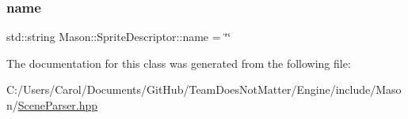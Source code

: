 \hypertarget{class_mason_1_1_sprite_descriptor_a78875744bb1e7ba41d6a35ccf83ba43c}{}\label{class_mason_1_1_sprite_descriptor_a78875744bb1e7ba41d6a35ccf83ba43c} 
\subsubsection{\texorpdfstring{name}{name}}
{\footnotesize\ttfamily std\+::string Mason\+::\+Sprite\+Descriptor\+::name = \char`\"{}\char`\"{}}



The documentation for this class was generated from the following file\+:\begin{DoxyCompactItemize}
\item 
C\+:/\+Users/\+Carol/\+Documents/\+Git\+Hub/\+Team\+Does\+Not\+Matter/\+Engine/include/\+Mason/\hyperlink{_scene_parser_8hpp}{Scene\+Parser.\+hpp}\end{DoxyCompactItemize}
